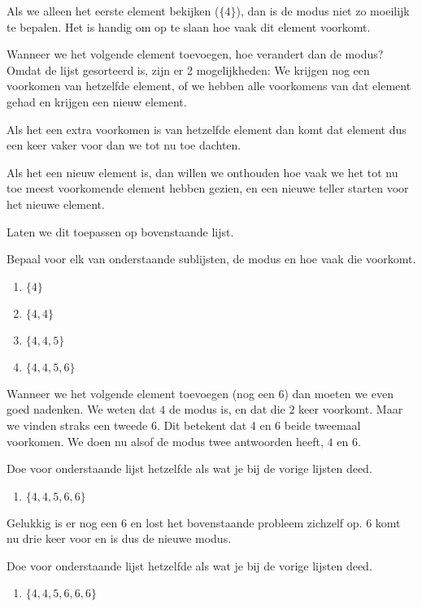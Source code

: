 Als we alleen het eerste element bekijken ($\{4\}$), dan is de modus niet zo moeilijk te bepalen. Het is handig om op te slaan hoe vaak dit element voorkomt.

Wanneer we het volgende element toevoegen, hoe verandert dan de modus? Omdat de lijst gesorteerd is, zijn er 2 mogelijkheden: We krijgen nog een voorkomen van hetzelfde element, of we hebben alle voorkomens van dat element gehad en krijgen een nieuw element.

Als het een extra voorkomen is van hetzelfde element dan komt dat element dus een keer vaker voor dan we tot nu toe dachten.

Als het een nieuw element is, dan willen we onthouden hoe vaak we het tot nu toe meest voorkomende element hebben gezien, en een nieuwe teller starten voor het nieuwe element.

Laten we dit toepassen op bovenstaande lijst. 

\bigskip
\? Bepaal voor elk van onderstaande sublijsten, de modus en hoe vaak die voorkomt.

\begin{enumerate}
	\item $\{4\}$
	\item $\{4, 4\}$
	\item $\{4, 4, 5\}$
	\item $\{4, 4, 5, 6\}$
\end{enumerate}

Wanneer we het volgende element toevoegen (nog een $6$) dan moeten we even goed nadenken. We weten dat $4$ de modus is, en dat die $2$ keer voorkomt. Maar we vinden straks een tweede $6$. Dit betekent dat 4 en 6 beide tweemaal voorkomen. We doen nu alsof de modus twee antwoorden heeft, $4$ en $6$.

\? Doe voor onderstaande lijst hetzelfde als wat je bij de vorige lijsten deed.

\begin{enumerate}[resume]
	\item $\{4, 4, 5, 6, 6\}$
\end{enumerate}

Gelukkig is er nog een $6$ en lost het bovenstaande probleem zichzelf op. $6$ komt nu drie keer voor en is dus de nieuwe modus.

\? Doe voor onderstaande lijst hetzelfde als wat je bij de vorige lijsten deed.

\begin{enumerate}[resume]
	\item $\{4, 4, 5, 6, 6, 6\}$
\end{enumerate}

